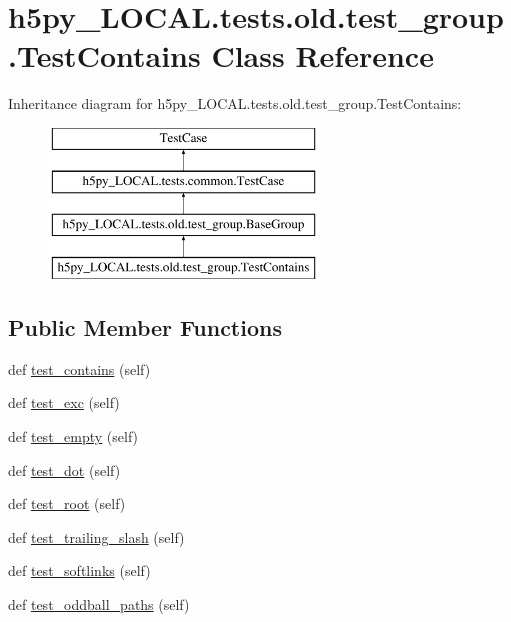 \hypertarget{classh5py__LOCAL_1_1tests_1_1old_1_1test__group_1_1TestContains}{}\section{h5py\+\_\+\+L\+O\+C\+A\+L.\+tests.\+old.\+test\+\_\+group.\+Test\+Contains Class Reference}
\label{classh5py__LOCAL_1_1tests_1_1old_1_1test__group_1_1TestContains}
Inheritance diagram for h5py\+\_\+\+L\+O\+C\+A\+L.\+tests.\+old.\+test\+\_\+group.\+Test\+Contains\+:\begin{figure}[H]
\begin{center}
\leavevmode
\includegraphics[height=4.000000cm]{classh5py__LOCAL_1_1tests_1_1old_1_1test__group_1_1TestContains}
\end{center}
\end{figure}
\subsection*{Public Member Functions}
\begin{DoxyCompactItemize}
\item 
def \hyperlink{classh5py__LOCAL_1_1tests_1_1old_1_1test__group_1_1TestContains_a3c86bef8d26cbb2a7768aa559e1d3218}{test\+\_\+contains} (self)
\item 
def \hyperlink{classh5py__LOCAL_1_1tests_1_1old_1_1test__group_1_1TestContains_a040d470e31150644a8c853d02d3d06e6}{test\+\_\+exc} (self)
\item 
def \hyperlink{classh5py__LOCAL_1_1tests_1_1old_1_1test__group_1_1TestContains_a964bb18d3467e0642a15b7853bf13a02}{test\+\_\+empty} (self)
\item 
def \hyperlink{classh5py__LOCAL_1_1tests_1_1old_1_1test__group_1_1TestContains_a66d49920420aad01f4806afcbe3b97bf}{test\+\_\+dot} (self)
\item 
def \hyperlink{classh5py__LOCAL_1_1tests_1_1old_1_1test__group_1_1TestContains_aafa5cee29fe97a5b2364c9c37140ae93}{test\+\_\+root} (self)
\item 
def \hyperlink{classh5py__LOCAL_1_1tests_1_1old_1_1test__group_1_1TestContains_a5871689c1aecf06ce4b529e72b634d33}{test\+\_\+trailing\+\_\+slash} (self)
\item 
def \hyperlink{classh5py__LOCAL_1_1tests_1_1old_1_1test__group_1_1TestContains_ace6cb7c30b6f49ddede373edb79a3dc3}{test\+\_\+softlinks} (self)
\item 
def \hyperlink{classh5py__LOCAL_1_1tests_1_1old_1_1test__group_1_1TestContains_aeb321e29d89f919242903daec3815630}{test\+\_\+oddball\+\_\+paths} (self)
\end{DoxyCompactItemize}
